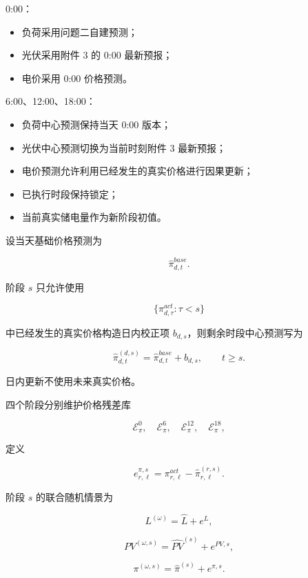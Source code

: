 0:00：

\begin{itemize}
\item 负荷采用问题二自建预测；
\item 光伏采用附件 3 的 0:00 最新预报；
\item 电价采用 0:00 价格预测。
\end{itemize}

6:00、12:00、18:00：

\begin{itemize}
\item 负荷中心预测保持当天 0:00 版本；
\item 光伏中心预测切换为当前时刻附件 3 最新预报；
\item 电价预测允许利用已经发生的真实价格进行因果更新；
\item 已执行时段保持锁定；
\item 当前真实储电量作为新阶段初值。
\end{itemize}

设当天基础价格预测为

\[
\hat\pi_{d,t}^{base}.
\]

阶段 \(s\) 只允许使用

\[
\{\pi^{act}_{d,\tau}:\tau<s\}
\]

中已经发生的真实价格构造日内校正项 \(b_{d,s}\)，则剩余时段中心预测写为

\begin{equation}
\hat\pi_{d,t}^{(d,s)}
=
\hat\pi_{d,t}^{base}
+
b_{d,s},
\qquad
t\ge s.
\end{equation}

日内更新不使用未来真实价格。

四个阶段分别维护价格残差库

\[
\mathcal E_\pi^0,\quad
\mathcal E_\pi^6,\quad
\mathcal E_\pi^{12},\quad
\mathcal E_\pi^{18},
\]

定义

\begin{equation}
e^{\pi,s}_{r,\ell}
=
\pi^{act}_{r,\ell}
-
\hat\pi^{(r,s)}_{r,\ell}.
\end{equation}

阶段 \(s\) 的联合随机情景为

\[
L^{(\omega)}
=
\hat L+e^L,
\]

\[
PV^{(\omega,s)}
=
\widehat{PV}^{(s)}
+
e^{PV,s},
\]

\begin{equation}
\pi^{(\omega,s)}
=
\hat\pi^{(s)}
+
e^{\pi,s}.
\end{equation}

